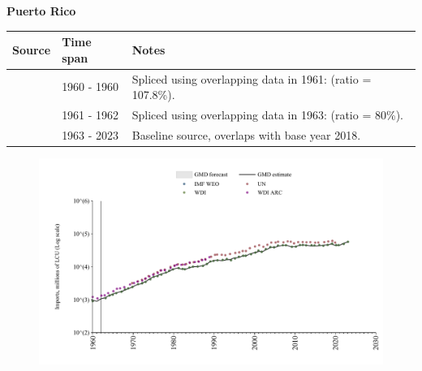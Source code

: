 \documentclass[12pt,a4paper,landscape]{article}
\begin{document}
\begin{adjustbox}{max totalsize={\paperwidth}{\paperheight},center}
\begin{minipage}[t][\textheight][t]{\textwidth}
\vspace*{0.5cm}
{}
\begin{center}
{\Large\bfseries Puerto Rico}
\end{center}
\vspace{0.5cm}
\begin{table}[H]
\centering
\small
\begin{tabular}{|l|l|l|}
\hline
\textbf{Source} & \textbf{Time span} & \textbf{Notes} \\
\hline
\rowcolor{white}\cite{WDI}& 1960 - 1960 &Spliced using overlapping data in 1961: (ratio = 107.8\%).\\
\rowcolor{lightgray}\cite{WDI_ARC}& 1961 - 1962 &Spliced using overlapping data in 1963: (ratio = 80\%).\\
\rowcolor{white}\cite{WDI}& 1963 - 2023 &Baseline source, overlaps with base year 2018.\\
\hline
\end{tabular}
\end{table}
\begin{figure}[H]
\centering
\includegraphics[width=\textwidth,height=0.6\textheight,keepaspectratio]{graphs/PRI_imports.pdf}
\end{figure}
\end{minipage}
\end{adjustbox}
\end{document}
